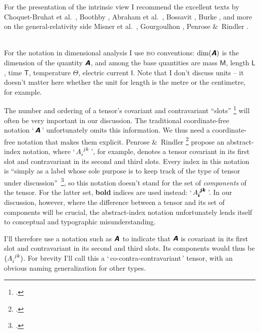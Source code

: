 \documentclass[\ifafour a4paper,12pt,\else a5paper,10pt,\fi%
onecolumn,oneside,article,%
british%
]{memoir}
\makeatletter
\newcommand*{\defquote}[1]{`\,#1\,'}
\theoremstyle{remark}
\theoremstyle{innote}
\newcommand*{\mathte}[1]{\textbf{\textit{\textsf{#1}}}}
\newcommand*{\citep}{\footcites}
\newcommand*{\citey}{\parencites*}%
\newcommand*{\amp}{\&}
\renewcommand*{\|}[1][]{\nonscript\,#1\vert\nonscript\;\mathopen{}}
\newcommand*{\sect}{\S}%
\newcommand*{\chap}{ch.}%
\newcommand*{\etal}{{et al.}}
\newcommand*{\q}{}%
\DeclareRobustCommand*{\q}{%
  \mathbin{\mathpalette\bigcdot@{}}%
}
\newcommand*{\bigcdot@scalefactor}{0.75}
\newcommand*{\bigcdot@widthfactor}{1.5}
\newcommand*{\bigcdot@}[2]{%
  \sbox0{$#1\vcenter{}$}%
  \sbox2{$#1\cdot\m@th$}%
  \hbox to \bigcdot@widthfactor\wd2{%
    \hfil
    \raise\ht0\hbox{%
      \scalebox{\bigcdot@scalefactor}{%
        \lower\ht0\hbox{$#1\bullet\m@th$}%
      }%
    }%
    \hfil
  }%
}
\newcommand*{\Le}{\textsf{L}}
\newcommand*{\Ti}{\textsf{T}}
\newcommand*{\Ma}{\textsf{M}}
\newcommand*{\Te}{\Theta}
\newcommand*{\Cu}{\textsf{I}}
\newcommand*{\yA}{\mathte{A}}
\renewcommand*{\i}{\indices}
\makeatother
\begin{document}
\medskip

For the presentation of the intrinsic view I recommend the excellent texts
by Choquet-Bruhat \etal\ \citey{choquetbruhatetal1977_r1996}, Boothby
\citey{boothby1975_r2003}, Abraham \etal\ \citey{abrahametal1983_r1988},
Bossavit \citey{bossavit1991}, Burke
\citey{burke1985_r1987}[\chap~2]{burke1980b}, and more on the
general-relativity side Misner \etal\
\citey[\chap~9]{misneretal1970_r1973}, Gourgoulhon
\citey[\chap~2]{gourgoulhon2007_r2012}, Penrose \amp\ Rindler
\citey[\chap~4]{penroseetal1984_r2003}. \textcolor{white}{If you find this
  you can claim a postcard from me.}

\bigskip

For the notation in dimensional analysis I use \textsc{iso} conventions:
$\dim(\yA)$ is the dimension of the quantity $\yA$, and among the base
quantities are mass $\Ma$, length $\Le$, time $\Ti$, temperature $\Te$,
electric current $\Cu$. Note that I don't discuss units -- it
doesn't matter here whether the unit for length is the metre or the
centimetre, for example.

The number and ordering of a tensor's covariant and contravariant
\enquote{slots} \citep[\sect~3.2]{misneretal1970_r1973} will often be very
important in our discussion. The traditional coordinate-free notation
\defquote{$\yA$} unfortunately omits this information. We thus need a
coordinate-free notation that makes them explicit. Penrose \amp\ Rindler
\citep[\sect~2.2]{penroseetal1984_r2003} propose an abstract-index
notation, where \defquote{$A\i{_{i}^{jk}}$}, for example, denotes a tensor
covariant in its first slot and contravariant in its second and third
slots. Every index in this notation is \enquote{simply as a label whose
  sole purpose is to keep track of the type of tensor under
  discussion}~\citep[p.~75]{penroseetal1984_r2003}, so this notation
doesn't stand for the set of \emph{components} of the tensor. For the
latter set, \textbf{bold} indices are used instead:
\defquote{$A\i{_{\pmb{i}}^{\pmb{j}\pmb{k}}}$}. In our discussion, however, where
the difference between a tensor and its set of components will be crucial,
the abstract-index notation unfortunately lends itself to conceptual and
typographic misunderstanding.

I'll therefore use a notation such as $\yA\i{_{\q}^{\q\q}}$ to
indicate that $\yA$ is covariant in its first slot and contravariant in its
second and third slots. Its components would thus be $(A\i{_{i}^{jk}})$.
For brevity I'll call this a \defquote{co-contra-contravariant} tensor,
with an obvious naming generalization for other
types. %
\end{document}
